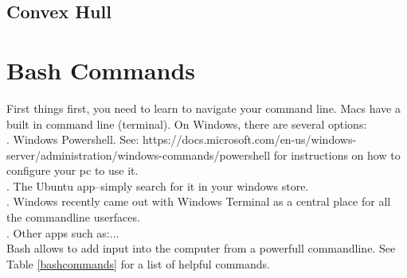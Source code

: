 \documentclass{article}
\begin{document}
\subsection{Convex Hull}

\section{Bash Commands}

First things first, you need to learn to navigate your command
line. Macs have a built in command line (terminal). On Windows, there
are several options:\\
. Windows Powershell. See:
https://docs.microsoft.com/en-us/windows-
server/administration/windows-commands/powershell
for instructions on how to configure your pc to use it.\\
. The Ubuntu app--simply search for it in your windows store.\\
. Windows recently came out with Windows Terminal as a 
central place for all the commandline userfaces.\\ 
. Other apps such as:...\\
Bash allows to add input into the computer from a powerfull
commandline. See Table
\ref{bashcommands} for a list of helpful commands. 
\end{document}
